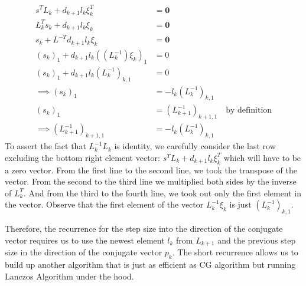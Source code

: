 \documentclass[]{article}
\theoremstyle{definition}
\begin{document}
\begin{appendices}
            \begin{align}
                s^TL_k + d_{k + 1}l_k \xi_k^T &= \mathbf{0}
                \\
                L_k^{T}s_k + d_{k + 1}l_k \xi_k &= \mathbf{0}
                \\
                s_k + L^{-T} d_{k + 1}l_k \xi_k &= \mathbf{0}
                \\
                (s_k)_1 + d_{k + 1}l_k ((L^{-1}_k)\xi_k)_1 &= 0
                \\
                (s_k)_1 + d_{k + 1}l_k(L^{-1}_k)_{k , 1} &= 0
                \\\implies
                (s_k)_1 &= - l_k(L^{-1}_k)_{k, 1} 
                \\
                (s_k)_1 &= (L^{-1}_{k + 1})_{k + 1, 1}  \quad \text{by definition}
                \\
                \implies
                (L^{-1}_{k + 1})_{k + 1, 1} &=
                -l_k(L^{-1}_k)_{k, 1}
            \end{align}
            To assert the fact that $L_k^{-1}L_k$ is identity, we carefully consider the last row excluding the bottom right element vector: $s^TL_k + d_{k + 1}l_k\xi_k^T$ which will have to be a zero vector. From the first line to the second line, we took the transpose of the vector. From the second to the third line we multiplied both sides by the inverse of $L_k^{T}$. And from the third to the fourth line, we took out only the first element in the vector. Observe that the first element of the vector $L_k^{-1}\xi_k$ is just $(L_k^{-1})_{k, 1}$. 
            \par
            Therefore, the recurrence for the step size into the direction of the conjugate vector requires us to use the newest element $l_k$ from $L_{k + 1}$ and the previous step size in the direction of the conjugate vector $p_k$. The short recurrence allows us to build up another algorithm that is just as efficient as CG algorithm but running Lanczos Algorithm under the hood. 
        

\end{appendices}
\end{document}
